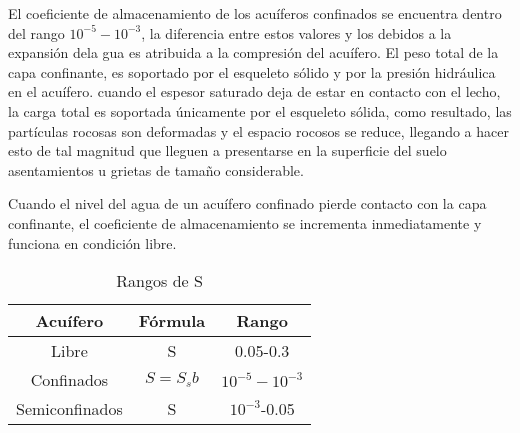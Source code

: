 El coeficiente de almacenamiento de los acuíferos confinados se encuentra dentro del rango $10^{-5}-10^{-3}$, la diferencia entre estos valores y los debidos a la expansión dela gua es atribuida a la compresión del acuífero. El peso total de la capa confinante, es soportado por el esqueleto sólido y por la presión hidráulica en el acuífero. cuando el espesor saturado deja de estar en contacto con el lecho, la carga total es soportada únicamente por el esqueleto sólida, como resultado, las partículas rocosas son deformadas y el espacio rocosos se reduce, llegando a hacer esto de tal magnitud que lleguen a presentarse en la superficie del suelo asentamientos u grietas de tamaño considerable.

Cuando el nivel del agua de un acuífero confinado pierde contacto con la capa confinante, el coeficiente de almacenamiento se incrementa inmediatamente y funciona en condición libre.
\begin{table}[h!]
    \centering
    \begin{tabular}{@{}ccc@{}}
    \toprule
    Acuífero       & Fórmula  & Rango                                                 \\ \midrule
    Libre          & S        & 0.05-0.3                                              \\
    Confinados     & $S=S_sb$ & $10^{-5}-10^{-3}$ \\
    Semiconfinados & S        & $10^{-3}$-0.05                       \\ \bottomrule
    \end{tabular}
    \caption{Rangos de S}
    \label{tabgh4}
\end{table}
